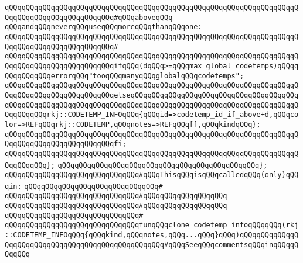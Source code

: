 \verb|qQQqqQQqqQQqqQQqqQQqqQQqqQQqqQQqqQQqqQQqqQQqqQQqqQQqqQQqqQQqqQQqqQQqqQQqqQQqqQQqqQQqqQQqqQQqqQQq#qQQqaboveqQQq--qQQqandqQQqneverqQQquseqQQqmoreqQQqthanqQQqone:|\newline
\verb|qQQqqQQqqQQqqQQqqQQqqQQqqQQqqQQqqQQqqQQqqQQqqQQqqQQqqQQqqQQqqQQqqQQqqQQqqQQqqQQqqQQqqQQqqQQqqQQq#|\newline
\verb|qQQqqQQqqQQqqQQqqQQqqQQqqQQqqQQqqQQqqQQqqQQqqQQqqQQqqQQqqQQqqQQqqQQqqQQqqQQqqQQqqQQqqQQqqQQqqQQqifqQQq(dqQQq>=qQQqmax_global_codetemps)qQQqqQQqqQQqqQQqerrorqQQq"tooqQQqmanyqQQqglobalqQQqcodetemps";|\newline
\verb|qQQqqQQqqQQqqQQqqQQqqQQqqQQqqQQqqQQqqQQqqQQqqQQqqQQqqQQqqQQqqQQqqQQqqQQqqQQqqQQqqQQqqQQqqQQqqQQqelseqQQqqQQqqQQqqQQqqQQqqQQqqQQqqQQqqQQqqQQqqQQqqQQqqQQqqQQqqQQqqQQqqQQqqQQqqQQqqQQqqQQqqQQqqQQqqQQqqQQqqQQqqQQqqQQqqQQqqQQqrkj::CODETEMP_INFOqQQq{qQQqid=>codetemp_id_if_above+d,qQQqcolor=>REFqQQqrkj::CODETEMP,qQQqnotes=>REFqQQq[],qQQqkindqQQq};|\newline
\verb|qQQqqQQqqQQqqQQqqQQqqQQqqQQqqQQqqQQqqQQqqQQqqQQqqQQqqQQqqQQqqQQqqQQqqQQqqQQqqQQqqQQqqQQqqQQqqQQqfi;|\newline
\verb|qQQqqQQqqQQqqQQqqQQqqQQqqQQqqQQqqQQqqQQqqQQqqQQqqQQqqQQqqQQqqQQqqQQqqQQqqQQqqQQq};|\newline
\verb|qQQqqQQqqQQqqQQqqQQqqQQqqQQqqQQqqQQqqQQqqQQqqQQq};|\newline
\newline
\verb|qQQqqQQqqQQqqQQqqQQqqQQqqQQqqQQq#qQQqThisqQQqisqQQqcalledqQQq(only)qQQqin:|\newline
\verb|qQQqqQQqqQQqqQQqqQQqqQQqqQQqqQQq#|\newline
\verb|qQQqqQQqqQQqqQQqqQQqqQQqqQQqqQQq#qQQqqQQqqQQqqQQqqQQq|\newline
\verb|qQQqqQQqqQQqqQQqqQQqqQQqqQQqqQQq#qQQqqQQqqQQqqQQqqQQq|\newline
\verb|qQQqqQQqqQQqqQQqqQQqqQQqqQQqqQQq#|\newline
\verb|qQQqqQQqqQQqqQQqqQQqqQQqqQQqqQQqfunqQQqclone_codetemp_infoqQQqqQQq(rkj::CODETEMP_INFOqQQq{qQQqkind,qQQqnotes,qQQq...qQQq}qQQq)qQQqqQQqqQQqqQQqqQQqqQQqqQQqqQQqqQQqqQQqqQQqqQQqqQQq#qQQqSeeqQQqcommentsqQQqinqQQqqQQqqQQq|\newline
